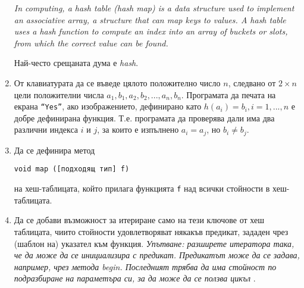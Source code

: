 \begin{enumerate}
    \textit{In computing, a hash table (hash map) is a data structure used to implement an associative array, a structure that can map keys to values. A hash table uses a hash function to compute an index into an array of buckets or slots, from which the correct value can be found.}
  
    Най-често срещаната дума е \textit{hash}.
  
    \item От клавиатурата да се въведе цялото положително число $n$, следвано от $2 \times n$ цели положителни числа $a_1, b_1, a_2, b_2, ..., a_n, b_n$. Програмата да печата на екрана \texttt{``Yes''}, ако изображението, дефинирано като $h(a_i)=b_i,i=1,...,n$ е добре дефинирана функция. Т.е. програмата да проверява дали има два различни индекса $i$ и $j$, за които е изпълнено $a_i=a_j$, но $b_i \neq b_j$.
  
    \item Да се дефинира метод
  
    \texttt{void map ([подходящ тип] f)}
  
    на хеш-таблицата, който прилага функцията \texttt{f} над всички стойности в хеш-таблицата.
  
    \item Да се добави възможност за итериране само на тези ключове от хеш таблицата, чиито стойности удовлетворяват някакъв предикат, зададен чрез (шаблон на) указател към функция. \emph{Упътване: разширете итератора така, че да може да се инициализира с предикат. Предикатът може да се задава, например, чрез метода begin. Последният трябва да има стойност по подразбиране на параметъра си, за да може да се ползва цикъл }.
  
  \end{enumerate}